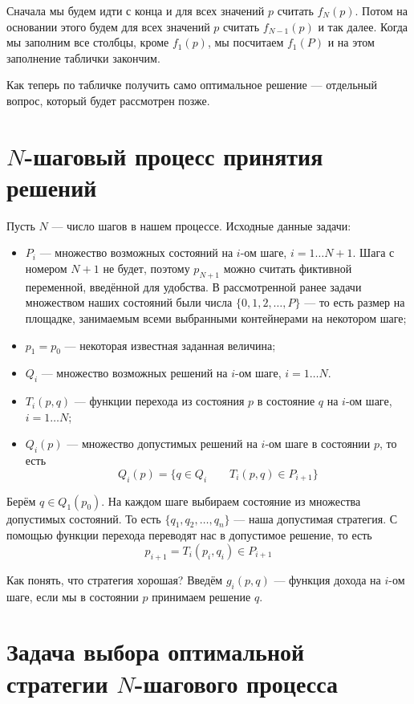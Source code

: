 Сначала мы будем идти с конца и для всех значений $p$ считать $f_N(p)$. Потом на основании этого будем для всех значений $p$ считать $f_{N-1}(p)$ и так далее. Когда мы заполним все столбцы, кроме $f_1(p)$, мы посчитаем $f_1(P)$ и на этом заполнение таблички закончим.

Как теперь по табличке получить само оптимальное решение --- отдельный вопрос, который будет рассмотрен позже.

\section{$N$-шаговый процесс принятия решений}

Пусть $N$ --- число шагов в нашем процессе. Исходные данные задачи:
\begin{itemize}
	\item $P_i$ --- множество возможных состояний на $i$-ом шаге, $i = 1 \dots N+1$. Шага с номером $N+1$ не будет, поэтому $p_{N+1}$ можно считать фиктивной переменной, введённой для удобства. В рассмотренной ранее задачи множеством наших состояний были числа $\{0, 1, 2, \dots, P\}$ --- то есть размер на площадке, занимаемым всеми выбранными контейнерами на некотором шаге;
	
	\item $p_1 = p_0$ --- некоторая известная заданная величина;
	
	\item $Q_i$ --- множество возможных решений на $i$-ом шаге, $i = 1 \dots N$.
	
	\item $T_i(p, q)$ --- функции перехода из состояния $p$ в состояние $q$ на $i$-ом шаге, $i = 1 \dots N$;
	
	\item $Q_i(p)$ --- множество допустимых решений на $i$-ом шаге в состоянии $p$, то есть
	\[
		Q_i(p) = \{q \in Q_i \qquad T_i(p, q) \in P_{i+1}\}
	\]	
\end{itemize}

Берём $q \in Q_1(p_0)$. На каждом шаге выбираем состояние из множества допустимых состояний. То есть $\{q_1, q_2, \dots, q_n\}$ --- наша допустимая стратегия. С помощью функции перехода переводят нас в допустимое решение, то есть
\[
	p_{i+1} = T_i(p_i, q_i) \in P_{i+1}
\]

Как понять, что стратегия хорошая? Введём $g_i(p, q)$ --- функция дохода на $i$-ом шаге, если мы в состоянии $p$ принимаем решение $q$.

\section{Задача выбора оптимальной стратегии $N$-шагового процесса}

